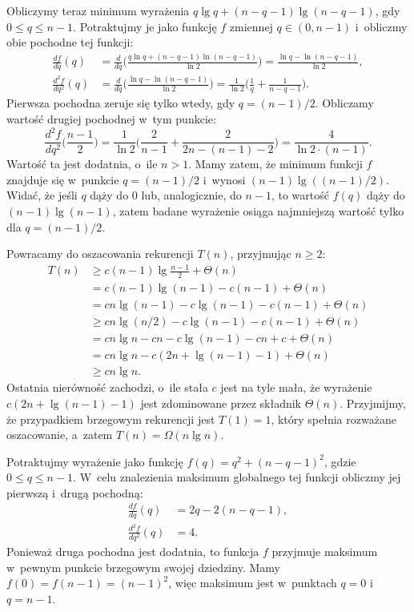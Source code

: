 Obliczymy teraz minimum wyrażenia $q\lg q+(n-q-1)\lg(n-q-1)$, gdy $0\le q\le n-1$. Potraktujmy je jako funkcję $f$ zmiennej $q\in(0,n-1)$ i~obliczmy obie pochodne tej funkcji:
\begin{align*}
    \frac{df}{dq}(q) &= \frac{d}{dq}\biggl(\frac{q\ln q+(n-q-1)\ln(n-q-1)}{\ln2}\biggr) = \frac{\ln q-\ln(n-q-1)}{\ln2}, \\[1mm]
	\frac{d^2\!f}{dq^2}(q) &= \frac{d}{dq}\biggl(\frac{\ln q-\ln(n-q-1)}{\ln2}\biggr) = \frac{1}{\ln2}\biggl(\frac{1}{q}+\frac{1}{n-q-1}\biggr).
\end{align*}
Pierwsza pochodna zeruje się tylko wtedy, gdy $q=(n-1)/2$. Obliczamy wartość drugiej pochodnej w~tym punkcie:
\[
    \frac{d^2\!f}{dq^2}\biggl(\frac{n-1}{2}\biggr) = \frac{1}{\ln2}\biggl(\frac{2}{n-1}+\frac{2}{2n-(n-1)-2}\biggr) = \frac{4}{\ln2\cdot(n-1)}.
\]
Wartość ta jest dodatnia, o~ile $n>1$. Mamy zatem, że minimum funkcji $f$ znajduje się w~punkcie $q=(n-1)/2$ i~wynosi $(n-1)\lg((n-1)/2)$. Widać, że jeśli $q$ dąży do 0 lub, analogicznie, do $n-1$, to wartość $f(q)$ dąży do $(n-1)\lg(n-1)$, zatem badane wyrażenie osiąga najmniejszą wartość tylko dla $q=(n-1)/2$.

Powracamy do oszacowania rekurencji $T(n)$, przyjmując $n\ge2$:
\begin{align*}
    T(n) &\ge c(n-1)\lg\frac{n-1}{2}+\Theta(n) \\
	&= c(n-1)\lg(n-1)-c(n-1)+\Theta(n) \\
	&= cn\lg(n-1)-c\lg(n-1)-c(n-1)+\Theta(n) \\
	&\ge cn\lg(n/2)-c\lg(n-1)-c(n-1)+\Theta(n) \\
	&= cn\lg n-cn-c\lg(n-1)-cn+c+\Theta(n) \\
	&= cn\lg n-c(2n+\lg(n-1)-1)+\Theta(n) \\
	&\ge cn\lg n.
\end{align*}
Ostatnia nierówność zachodzi, o~ile stała $c$ jest na tyle mała, że wyrażenie $c(2n+\lg(n-1)-1)$ jest zdominowane przez składnik $\Theta(n)$. Przyjmijmy, że przypadkiem brzegowym rekurencji jest $T(1)=1$, który spełnia rozważane oszacowanie, a~zatem $T(n)=\Omega(n\lg n)$.

\exercise %
Potraktujmy wyrażenie jako funkcję $f(q)=q^2+(n-q-1)^2$, gdzie $0\le q\le n-1$. W~celu znalezienia maksimum globalnego tej funkcji obliczmy jej pierwszą i~drugą pochodną:
\begin{align*}
    \frac{df}{dq}(q) &= 2q-2(n-q-1), \\
	\frac{d^2\!f}{dq^2}(q) &= 4.
\end{align*}
Ponieważ druga pochodna jest dodatnia, to funkcja $f$ przyjmuje maksimum w~pewnym punkcie brzegowym swojej dziedziny. Mamy $f(0)=f(n-1)=(n-1)^2$, więc maksimum jest w~punktach $q=0$ i~$q=n-1$. 

